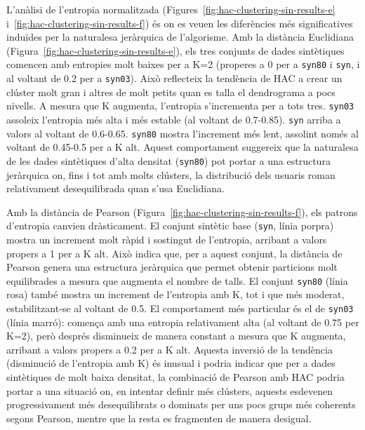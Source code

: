\documentclass[a4paper,12pt]{report}
\begin{document}
L'anàlisi de l'entropia normalitzada (Figures~\ref{fig:hac-clustering-sin-results-e} i~\ref{fig:hac-clustering-sin-results-f}) és on es veuen les diferències més significatives induïdes per la naturalesa jeràrquica de l'algorisme. Amb la distància Euclidiana (Figura~\ref{fig:hac-clustering-sin-results-e}), els tres conjunts de dades sintètiques comencen amb entropies molt baixes per a K=2 (properes a 0 per a \texttt{syn80} i \texttt{syn}, i al voltant de 0.2 per a \texttt{syn03}). Això reflecteix la tendència de HAC a crear un clúster molt gran i altres de molt petits quan es talla el dendrograma a pocs nivells. A mesura que K augmenta, l'entropia s'incrementa per a tots tres. \texttt{syn03} assoleix l'entropia més alta i més estable (al voltant de 0.7-0.85). \texttt{syn} arriba a valors al voltant de 0.6-0.65. \texttt{syn80} mostra l'increment més lent, assolint només al voltant de 0.45-0.5 per a K alt. Aquest comportament suggereix que la naturalesa de les dades sintètiques d'alta densitat (\texttt{syn80}) pot portar a una estructura jeràrquica on, fins i tot amb molts clústers, la distribució dels usuaris roman relativament desequilibrada quan s'usa Euclidiana.

Amb la distància de Pearson (Figura~\ref{fig:hac-clustering-sin-results-f}), els patrons d'entropia canvien dràsticament. El conjunt sintètic base (\texttt{syn}, línia porpra) mostra un increment molt ràpid i sostingut de l'entropia, arribant a valors propers a 1 per a K alt. Això indica que, per a aquest conjunt, la distància de Pearson genera una estructura jeràrquica que permet obtenir particions molt equilibrades a mesura que augmenta el nombre de talls. El conjunt \texttt{syn80} (línia rosa) també mostra un increment de l'entropia amb K, tot i que més moderat, estabilitzant-se al voltant de 0.5. El comportament més particular és el de \texttt{syn03} (línia marró): comença amb una entropia relativament alta (al voltant de 0.75 per K=2), però després disminueix de manera constant a mesura que K augmenta, arribant a valors propers a 0.2 per a K alt. Aquesta inversió de la tendència (disminució de l'entropia amb K) és inusual i podria indicar que per a dades sintètiques de molt baixa densitat, la combinació de Pearson amb HAC podria portar a una situació on, en intentar definir més clústers, aquests esdevenen progressivament més desequilibrats o dominats per uns pocs grups més coherents segons Pearson, mentre que la resta es fragmenten de manera desigual.
\end{document}
